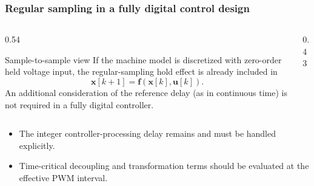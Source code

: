 \begin{frame}
    \frametitle{Regular sampling in a fully digital control design}
    \begin{columns}[c,onlytextwidth]
        \begin{column}{0.54\textwidth}
            \begin{varblock}{Sample-to-sample view}
                If the machine model is discretized with zero-order held voltage input, the regular-sampling hold effect is already included in
                \begin{equation}
                    \bm{x}[k+1]=\bm{f}(\bm{x}[k],\bm{u}[k]).
                \end{equation}
                An additional consideration of the reference delay (as in continuous time) is not required in a fully digital controller.
            \end{varblock}
        \end{column}
        \begin{column}{0.43\textwidth}
            \centering
        \end{column}
    \end{columns}
    \vspace{0.25cm}
    \begin{itemize}
        \item<2-> The integer controller-processing delay remains and must be handled explicitly.
        \item<3-> Time-critical decoupling and transformation terms should be evaluated at the effective PWM interval.
    \end{itemize}
\end{frame}

